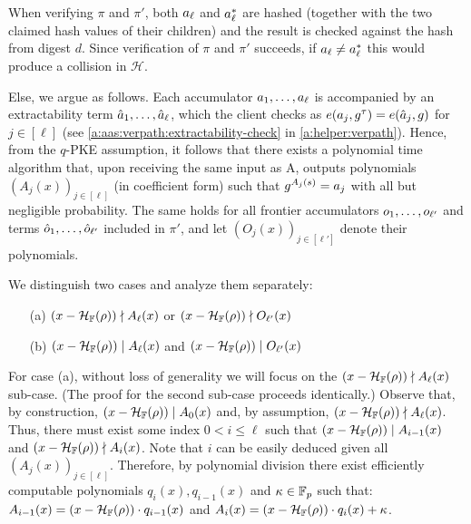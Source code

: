 When verifying $\pi$ and $\pi'$, both $\textcolor{black}{a}_\ell$ and $\textcolor{black}{a}^*_\ell$ are hashed (together with the two claimed hash values of their children) and the result is checked against the hash from digest $d$.
Since verification of $\pi$ and $\pi'$ succeeds, if $\textcolor{black}{a}_\ell \neq \textcolor{black}{a}^*_\ell$ this would produce a collision in $\mathcal{H}$.

Else, we argue as follows.
Each accumulator $\textcolor{black}{a}_1,\dots,\textcolor{black}{a}_\ell$ is accompanied by an extractability term $\textcolor{black}{\hat{a}}_1,\dots,\textcolor{black}{\hat{a}}_\ell$, which the client checks as $e(\textcolor{black}{a}_j,g^\tau)= e(\textcolor{black}{\hat{a}}_j,g)$ for $j\in[\ell]$ (see \cref{a:aas:verpath:extractability-check} in \cref{a:helper:verpath}).
Hence, from the $q$-PKE assumption, it follows that there exists a polynomial time algorithm that, upon receiving the same input as \textsf{A}, outputs polynomials $(A_j(x))_{j\in[\ell]}$ (in coefficient form) such that $g^{A_j(s)} = \textcolor{black}{a}_j$ with all but negligible probability.
The same holds for all frontier accumulators $o_1,\dots,o_{\ell'}$ and terms $\hat{o}_1,\dots,\hat{o}_{\ell'}$ included in $\pi'$, and let $(O_{j}(x))_{j\in[\ell']}$ denote their polynomials.

We distinguish two cases and analyze them separately:
\begin{itemize}
    \item[(a)] $ (x-\mathcal{H}_{\mathbb{F}}(\rho)) \nmid A_\ell(x)$ or $ (x-\mathcal{H}_{\mathbb{F}}(\rho)) \nmid O_{\ell'}(x)$
    \item[(b)] $ (x-\mathcal{H}_{\mathbb{F}}(\rho)) \;|\; A_\ell(x)$ and $ (x-\mathcal{H}_{\mathbb{F}}(\rho)) \;|\; O_{\ell'}(x)$
\end{itemize}

For case (a), without loss of generality we will focus on the $(x-\mathcal{H}_{\mathbb{F}}(\rho)) \nmid A_\ell(x)$ sub-case.
(The proof for the second sub-case proceeds identically.)
Observe that, by construction, $(x-\mathcal{H}_{\mathbb{F}}(\rho)) \mathrel| A_0(x)$ and, by assumption, $(x-\mathcal{H}_{\mathbb{F}}(\rho)) \nmid A_\ell(x)$.
Thus, there must exist some index $0 < i \le \ell$ such that $(x-\mathcal{H}_{\mathbb{F}}(\rho)) \mathrel| A_{i-1}(x)$ and $(x-\mathcal{H}_{\mathbb{F}}(\rho)) \nmid A_i(x)$.
Note that $i$ can be easily deduced given all  $(A_j(x))_{j\in[\ell]}$.
Therefore, by polynomial division there exist efficiently computable polynomials $q_{i}{(x)},q_{i-1}(x)$ and $\kappa\in \mathbb{F}_p$ such that: $A_{i-1}(x) = (x-\mathcal{H}_{\mathbb{F}}(\rho))\cdot q_{i-1}(x)$ and $A_{i}(x) = (x-\mathcal{H}_{\mathbb{F}}(\rho))\cdot q_{i}(x) + \kappa$.

